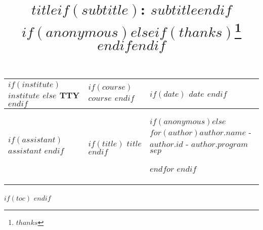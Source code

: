 \documentclass[$if(fontsize)$$fontsize$,$endif$$if(lang)$$babel-lang$,$endif$$if(papersize)$$papersize$,$endif$$for(classoption)$$classoption$$sep$,$endfor$]{article}
\title{$title$$if(subtitle)$: $subtitle$$endif$ $if(anonymous)$$else$$if(thanks)$\thanks{$thanks$} $endif$$endif$ }
\date{}
\begin{document}

\pagestyle{empty}


\begin{center}
    \bgroup
    \renewcommand{\arraystretch}{2.0}
    \begin{tabular}{ | p{2.0cm} | p{5cm} | p{7cm} |}
    \hline
    $if(institute)$ $institute$ $else$ TTY $endif$ &
    $if(course)$ $course$ $endif$ &
    $if(date)$ $date$ $endif$ \\ \hline
    $if(assistant)$ $assistant$ $endif$ &
    $if(title)$ $title$ $endif$ &
    $if(anonymous)$\hfill $else$$for(author)$$author.name$ - \emph{\small $author.id$} - \emph{\small $author.program$}  $sep$ \par $endfor$ $endif$ \\
    \hline
    \end{tabular}
    \egroup
\end{center}
\newpage

\pagestyle{plain}                       %
\setcounter{secnumdepth}{-1}            %

\linespread{1.2}                        %
\selectfont                             %

$if(toc)$
{
\hypersetup{linkcolor=black}
\setcounter{tocdepth}{$toc-depth$}
\tableofcontents
\newpage
}
$endif$

\setcounter{secnumdepth}{2}            %
\linespread{1.3}                       %
\selectfont                            %

\end{document}

